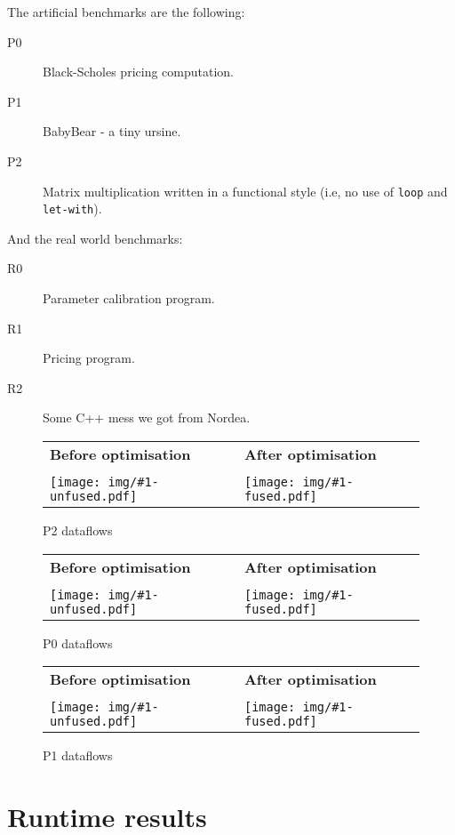 The artificial benchmarks are the following:

\begin{description}
\item[P0] Black-Scholes\cite{black1973pricing} pricing computation.

\item[P1] BabyBear - a tiny ursine.

\item[P2] Matrix multiplication written in a functional style (i.e, no
  use of \texttt{loop} and \texttt{let-with}).
\end{description}

And the real world benchmarks:

\begin{description}
\item[R0] Parameter calibration program.

\item[R1] Pricing program.

\item[R2] Some C++ mess we got from Nordea.
\end{description}

\newcommand{\dataflowtable}[1]{
\begin{center}
\begin{tabular}{p{4cm}|p{4cm}}
\textbf{Before optimisation} & \hfill\textbf{After optimisation} \\
& \\
\texttt{[image: img/\#1-unfused.pdf]} &
\hfill \texttt{[image: img/\#1-fused.pdf]}
\end{tabular}
\end{center}
}

\begin{figure}
\dataflowtable{MatMultFun}
\caption{P2 dataflows}
\label{fig:p2-dataflows}
\end{figure}

\begin{figure}
\dataflowtable{BlackScholes}
\caption{P0 dataflows}
\label{fig:p0-dataflows}
\end{figure}

\begin{figure}
\dataflowtable{BabyBear}
\caption{P1 dataflows}
\label{fig:p1-dataflows}
\end{figure}

\section{Runtime results}
\label{sec:runtime-results}


